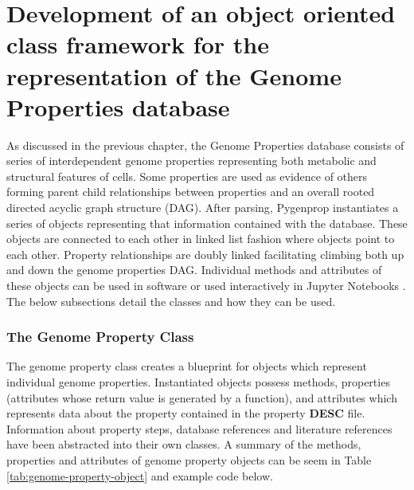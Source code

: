 \section{Development of an object oriented class framework for the representation of the Genome Properties database}

As discussed in the previous chapter, the Genome Properties database consists of series of interdependent genome properties representing both metabolic and structural features of cells. Some properties are used as evidence of others forming parent child relationships between properties and an overall rooted directed acyclic graph structure (DAG). After parsing, Pygenprop instantiates a series of objects representing that information contained with the database. These objects are connected to each other in linked list fashion where objects point to each other. Property relationships are doubly linked facilitating climbing both up and down the genome properties DAG. Individual methods and attributes of these objects can be used in software or used interactively in Jupyter Notebooks \cite{kluyver2016jupyter}. The below subsections detail the classes and how they can be used.

\subsubsection{The Genome Property Class}

The genome property class creates a blueprint for objects which represent individual genome properties. Instantiated objects possess methods, properties (attributes whose return value is generated by a function), and attributes which represents data about the property contained in the property \textbf{DESC} file. Information about property steps, database references and literature references have been abstracted into their own classes. A summary of the methods, properties and attributes of genome property objects can be seem in Table \ref{tab:genome-property-object} and example code below.

